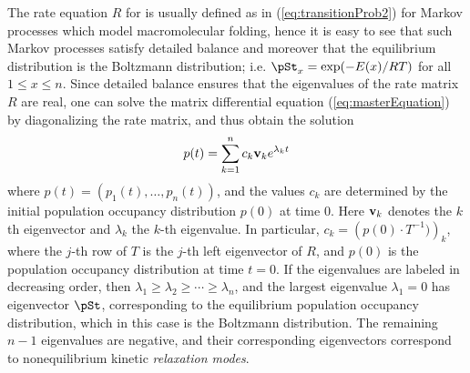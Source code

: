 The rate equation $R$ for is usually defined
as in (\ref{eq:transitionProb2}) for
Markov processes which model macromolecular folding,
hence it is easy to see that
such Markov processes satisfy detailed balance and moreover that
the equilibrium distribution is the
Boltzmann distribution; i.e.  $\pSt_x = \exp(-E(x)/RT)$ for
all $1 \leq x \leq n$.
Since detailed balance ensures that the eigenvalues of the rate matrix $R$ are
real, one can solve the matrix differential equation
(\ref{eq:masterEquation}) by diagonalizing the rate matrix, and thus obtain
the solution
\begin{align}
\label{eq:populationOccupancyEquation}
p(t) = \sum_{k=1}^n c_k {\bf v}_k e^{\lambda_k t}
\end{align}
where $p(t) = (p_1(t),\ldots,p_n(t))$, and the
values $c_k$ are determined by the initial population occupancy
distribution $p(0)$ at time $0$. Here
${\bf v}_k$ denotes the $k$th eigenvector and
$\lambda_k$ the $k$-th eigenvalue. In particular,
$c_k = \left(p(0) \cdot T^{-1})\right)_k$, where the $j$-th row of $T$
is the $j$-th left eigenvector of $R$,
and $p(0)$ is the population occupancy distribution
at time $t=0$. If the eigenvalues are labeled in decreasing
order, then $\lambda_1 \geq \lambda_2 \geq \cdots \geq \lambda_n$,
and the largest eigenvalue $\lambda_1=0$ has eigenvector $\pSt$, corresponding
to the equilibrium population occupancy distribution, which in this case
is the Boltzmann distribution. The
remaining $n-1$ eigenvalues are negative, and their corresponding eigenvectors
correspond to nonequilibrium kinetic {\em relaxation modes}.


